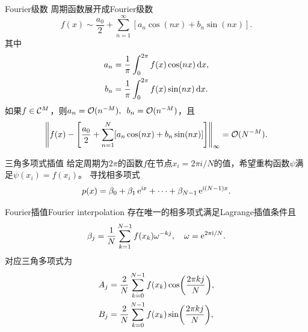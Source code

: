 \begin{definition}
    {Fourier级数}{}
    周期函数展开成Fourier级数
    \begin{equation}
        f(x)\sim\frac{a_0}2+\sum_{n=1}^\infty[a_n\cos(nx)+b_n\sin(nx)].
    \end{equation}
    其中
    \begin{subequations}
        \begin{align}
            a_n&=\frac1\pi\int_0^{2\pi}f(x)\cos(nx)\mathop{}\!\mathrm{d} x,\\
            b_n&=\frac1\pi\int_0^{2\pi}f(x)\sin(nx)\mathop{}\!\mathrm{d} x.
        \end{align}
    \end{subequations}
    \tcblower
    如果$f\in\mathcal C^M$，则$a_n=\mathcal O(n^{-M}),\enspace b_n=\mathcal O(n^{-M})$，且
    \[
        \left\lVert f(x)-\left[\frac{a_0}2+\sum_{n=1}^N[a_n\cos(nx)+b_n\sin(nx)]\right]\right\rVert_\infty=\mathcal O(N^{-M}).
    \] 
\end{definition}

\begin{definition}
    {三角多项式插值}{}
    给定周期为$2\pi$的函数$f$在节点$x_i=2\pi i/N$的值，希望重构函数$\psi$满足$\psi(x_i)=f(x_i)$。
    \tcblower
    寻找相多项式
    \begin{equation}
        p(x)=\beta_0+\beta_1\mathop{}\!\mathrm{e}^{\mathrm{i} x}+\cdots+\beta_{N-1}\mathop{}\!\mathrm{e}^{\mathrm{i}(N-1)x}.
    \end{equation}
\end{definition}

\begin{theorem}
    {Fourier插值}{Fourier interpolation}
    存在唯一的相多项式满足Lagrange插值条件且
    \begin{equation}
        \label{eqn:Fourier betaj}
        \beta_j=\frac1N\sum_{k=1}^{N-1}f(x_k)\omega^{-kj},\quad\omega=\mathop{}\!\mathrm{e}^{2\pi\mathrm{i}/N}.
    \end{equation}
    对应三角多项式为
    \begin{subequations}
        \begin{align}
            A_j&=\frac2N\sum_{k=0}^{N-1}f(x_k)\cos\biggl(\frac{2\pi kj}N\biggr),\\
            B_j&=\frac2N\sum_{k=0}^{N-1}f(x_k)\sin\biggl(\frac{2\pi kj}N\biggr),
        \end{align}
    \end{subequations}
\end{theorem}






